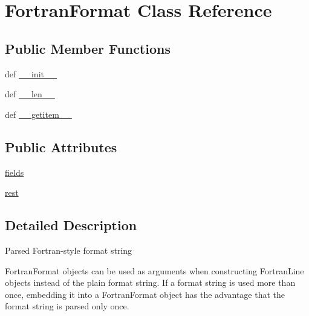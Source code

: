 \hypertarget{classpyneb_1_1utils_1_1_fortran_format_1_1_fortran_format}{\section{Fortran\-Format Class Reference}
\label{classpyneb_1_1utils_1_1_fortran_format_1_1_fortran_format}
}
\subsection*{Public Member Functions}
\begin{DoxyCompactItemize}
\item 
def \hyperlink{classpyneb_1_1utils_1_1_fortran_format_1_1_fortran_format_ac775ee34451fdfa742b318538164070e}{\-\_\-\-\_\-init\-\_\-\-\_\-}
\item 
def \hyperlink{classpyneb_1_1utils_1_1_fortran_format_1_1_fortran_format_af6412d48d9a71eac81e3195b52455aaa}{\-\_\-\-\_\-len\-\_\-\-\_\-}
\item 
def \hyperlink{classpyneb_1_1utils_1_1_fortran_format_1_1_fortran_format_a50d766f4276c3d8fe330ac8cd344a75f}{\-\_\-\-\_\-getitem\-\_\-\-\_\-}
\end{DoxyCompactItemize}
\subsection*{Public Attributes}
\begin{DoxyCompactItemize}
\item 
\hyperlink{classpyneb_1_1utils_1_1_fortran_format_1_1_fortran_format_a0ac22a12ba104aaad1f7652877543f3b}{fields}
\item 
\hyperlink{classpyneb_1_1utils_1_1_fortran_format_1_1_fortran_format_a9428b74721f542f400b0c97507688556}{rest}
\end{DoxyCompactItemize}


\subsection{Detailed Description}
\begin{DoxyVerb}Parsed Fortran-style format string

FortranFormat objects can be used as arguments when constructing
FortranLine objects instead of the plain format string. If a
format string is used more than once, embedding it into a FortranFormat
object has the advantage that the format string is parsed only once.
\end{DoxyVerb}
 

